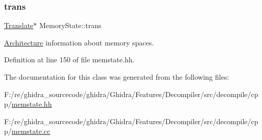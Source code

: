 \mbox{\label{class_memory_state_a5ca981e0a6790657297a29da282c343b}} 
\subsubsection{\texorpdfstring{trans}{trans}}
{\footnotesize\ttfamily \mbox{\hyperlink{class_translate}{Translate}}$\ast$ Memory\+State\+::trans\hspace{0.3cm}{\ttfamily [protected]}}



\mbox{\hyperlink{class_architecture}{Architecture}} information about memory spaces. 



Definition at line 150 of file memstate.\+hh.



The documentation for this class was generated from the following files\+:\begin{DoxyCompactItemize}
\item 
F\+:/re/ghidra\+\_\+sourcecode/ghidra/\+Ghidra/\+Features/\+Decompiler/src/decompile/cpp/\mbox{\hyperlink{memstate_8hh}{memstate.\+hh}}\item 
F\+:/re/ghidra\+\_\+sourcecode/ghidra/\+Ghidra/\+Features/\+Decompiler/src/decompile/cpp/\mbox{\hyperlink{memstate_8cc}{memstate.\+cc}}\end{DoxyCompactItemize}
